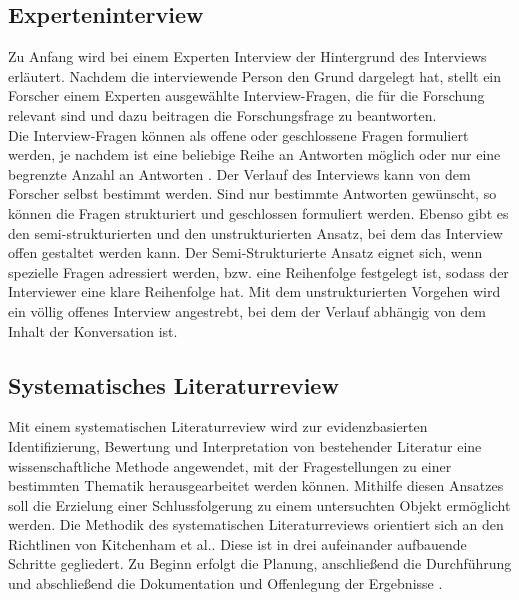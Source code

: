    \subsection{Experteninterview}
    \label{subsec:experteninterview}
        Zu Anfang wird bei einem Experten Interview der Hintergrund des Interviews erläutert. Nachdem die interviewende 
        Person den Grund dargelegt hat, stellt ein Forscher einem Experten ausgewählte Interview-Fragen, die für die 
        Forschung relevant sind und dazu beitragen die Forschungsfrage zu beantworten.
        \\
        \linebreak
        Die Interview-Fragen können als offene oder geschlossene Fragen formuliert werden, je nachdem ist eine beliebige Reihe 
        an Antworten möglich oder nur eine begrenzte Anzahl an Antworten \cite{robson2002real}. Der Verlauf des Interviews 
        kann von dem Forscher selbst bestimmt werden. Sind nur bestimmte Antworten gewünscht, so können die Fragen strukturiert und 
        geschlossen formuliert werden. Ebenso gibt es den semi-strukturierten und den unstrukturierten Ansatz, bei dem das Interview 
        offen gestaltet werden kann. Der Semi-Strukturierte Ansatz eignet sich, wenn spezielle Fragen adressiert werden, bzw. eine 
        Reihenfolge festgelegt ist, sodass der Interviewer eine klare Reihenfolge hat. Mit dem unstrukturierten Vorgehen wird 
        ein völlig offenes Interview angestrebt, bei dem der Verlauf abhängig von dem Inhalt der Konversation ist.

    \subsection{Systematisches Literaturreview}
    \label{subsec:systematischesliteraturreview}
        Mit einem systematischen Literaturreview wird zur evidenzbasierten Identifizierung, Bewertung und Interpretation  
        von bestehender Literatur eine wissenschaftliche Methode angewendet, mit der Fragestellungen zu einer bestimmten Thematik 
        herausgearbeitet werden können. Mithilfe diesen Ansatzes soll die Erzielung einer Schlussfolgerung zu einem untersuchten Objekt 
        ermöglicht werden. 
        Die Methodik des systematischen Literaturreviews orientiert sich an den Richtlinen von Kitchenham et al.. Diese ist in drei 
        aufeinander aufbauende Schritte gegliedert. Zu Beginn erfolgt die Planung, anschließend die Durchführung und abschließend die 
        Dokumentation und Offenlegung der Ergebnisse \cite{Kitchenham2007}.

